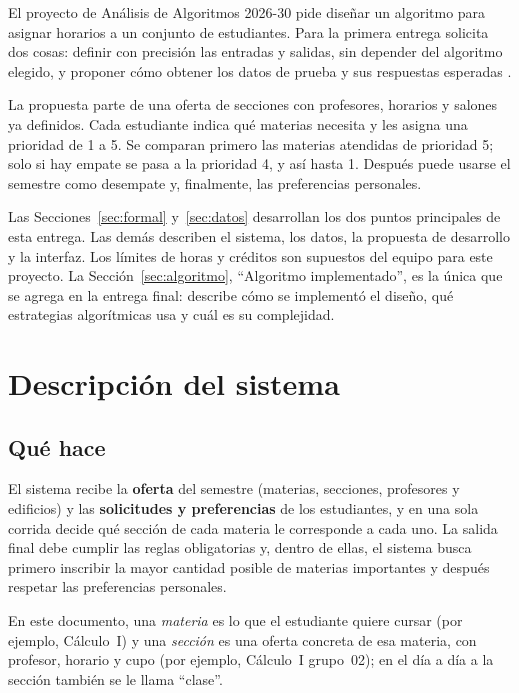 \documentclass[pdflatex,sn-mathphys-num]{sn-jnl}%
\begin{document}
El proyecto de Análisis de Algoritmos 2026-30 pide diseñar un algoritmo para asignar horarios a un conjunto de estudiantes. Para la primera entrega solicita dos cosas: definir con precisión las entradas y salidas, sin depender del algoritmo elegido, y proponer cómo obtener los datos de prueba y sus respuestas esperadas \cite{enunciado}.

La propuesta parte de una oferta de secciones con profesores, horarios y salones ya definidos. Cada estudiante indica qué materias necesita y les asigna una prioridad de 1 a 5. Se comparan primero las materias atendidas de prioridad 5; solo si hay empate se pasa a la prioridad 4, y así hasta 1. Después puede usarse el semestre como desempate y, finalmente, las preferencias personales.

Las Secciones~\ref{sec:formal} y~\ref{sec:datos} desarrollan los dos puntos principales de esta entrega. Las demás describen el sistema, los datos, la propuesta de desarrollo y la interfaz. Los límites de horas y créditos son supuestos del equipo para este proyecto. La Sección~\ref{sec:algoritmo}, ``Algoritmo implementado'', es la única que se agrega en la entrega final: describe cómo se implementó el diseño, qué estrategias algorítmicas usa y cuál es su complejidad.

\section{Descripción del sistema}\label{sec:sistema}

\subsection{Qué hace}

El sistema recibe la \textbf{oferta} del semestre (materias, secciones, profesores y edificios) y las \textbf{solicitudes y preferencias} de los estudiantes, y en una sola corrida decide qué sección de cada materia le corresponde a cada uno. La salida final debe cumplir las reglas obligatorias y, dentro de ellas, el sistema busca primero inscribir la mayor cantidad posible de materias importantes y después respetar las preferencias personales.

En este documento, una \emph{materia} es lo que el estudiante quiere cursar (por ejemplo, Cálculo~I) y una \emph{sección} es una oferta concreta de esa materia, con profesor, horario y cupo (por ejemplo, Cálculo~I grupo~02); en el día a día a la sección también se le llama ``clase''.
\end{document}
